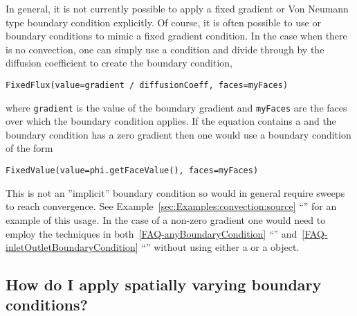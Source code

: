    In general, it is not currently possible to apply a fixed gradient or Von
    Neumann type boundary condition explicitly. Of course, it is often possible
    to use  or  boundary conditions to mimic a
    fixed gradient condition. In the case when there is no convection, one can
    simply use a  condition and divide through by the diffusion
    coefficient to create the boundary condition,
\begin{verbatim}
FixedFlux(value=gradient / diffusionCoeff, faces=myFaces)
\end{verbatim}
    where \verb+gradient+ is the value of the boundary gradient and
    \verb+myFaces+ are the faces over which the boundary condition applies.  If
    the equation contains a  and the boundary condition has
    a zero gradient then one would use a  boundary condition of
    the form
\begin{verbatim}
FixedValue(value=phi.getFaceValue(), faces=myFaces)
\end{verbatim}
    This is not an ''implicit'' boundary condition so would in general require
    sweeps to reach convergence. See Example~\ref{sec:Examples:convection:source}
    ``'' for an example of this usage.
    In the case of a non-zero gradient one would need to employ the techniques in
    both~\ref{FAQ-anyBoundaryCondition} ``''
    and~\ref{FAQ-inletOutletBoundaryCondition}
    ``'' without using either a
     or a  object.

    \subsection{How do I apply spatially varying boundary conditions?}

